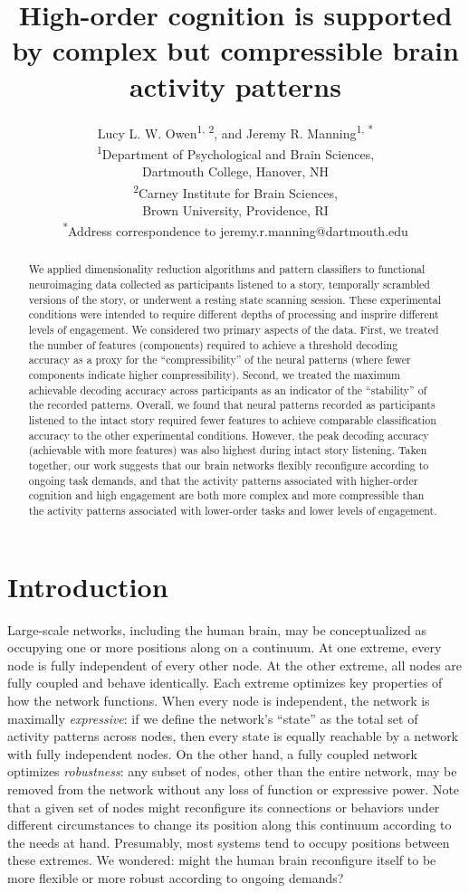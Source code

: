 \documentclass[english]{article}
\title{High-order cognition is supported by complex but compressible brain activity patterns}
\author{Lucy L. W. Owen\textsuperscript{1, 2}, and Jeremy R. Manning\textsuperscript{1,
*}\\\textsuperscript{1}Department of Psychological and Brain Sciences,\\Dartmouth College,
Hanover, NH\\[0.1cm]\textsuperscript{2}Carney Institute for Brain Sciences,\\Brown University,
Providence, RI\\[0.1cm] \textsuperscript{*}Address correspondence to
jeremy.r.manning@dartmouth.edu}
\begin{document}
\maketitle


\begin{abstract} 

We applied dimensionality reduction algorithms and pattern classifiers to
functional neuroimaging data collected as participants listened to a story,
temporally scrambled versions of the story, or underwent a resting state
scanning session. These experimental conditions were intended to require
different depths of processing and insprire different levels of engagement. We
considered two primary aspects of the data. First, we treated the number of
features (components) required to achieve a threshold decoding accuracy as a
proxy for the ``compressibility'' of the neural patterns (where fewer
components indicate higher compressibility). Second, we treated the maximum
achievable decoding accuracy across participants as an indicator of the
``stability'' of the recorded patterns. Overall, we found that neural patterns
recorded as participants listened to the intact story required fewer features
to achieve comparable classification accuracy to the other experimental
conditions. However, the peak decoding accuracy (achievable with more features)
was also highest during intact story listening. Taken together, our work
suggests that our brain networks flexibly reconfigure according to ongoing task
demands, and that the activity patterns associated with higher-order cognition
and high engagement are both more complex and more compressible than the
activity patterns associated with lower-order tasks and lower levels of
engagement.

\end{abstract}

\doublespacing

\section*{Introduction}

Large-scale networks, including the human brain, may be conceptualized as
occupying one or more positions along on a continuum. At one extreme, every
node is fully independent of every other node. At the other extreme, all nodes
are fully coupled and behave identically. Each extreme optimizes key properties
of how the network functions. When every node is independent, the network is
maximally \textit{expressive}: if we define the network's ``state'' as the
total set of activity patterns across nodes, then every state is equally
reachable by a network with fully independent nodes. On the other hand, a fully
coupled network optimizes \textit{robustness}: any subset of nodes, other than
the entire network, may be removed from the network without any loss of
function or expressive power. Note that a given set of nodes might reconfigure
its connections or behaviors under different circumstances to change its
position along this continuum according to the needs at hand. Presumably, most
systems tend to occupy positions between these extremes. We wondered: might
the human brain reconfigure itself to be more flexible or more robust according
to ongoing demands?
\end{document}
